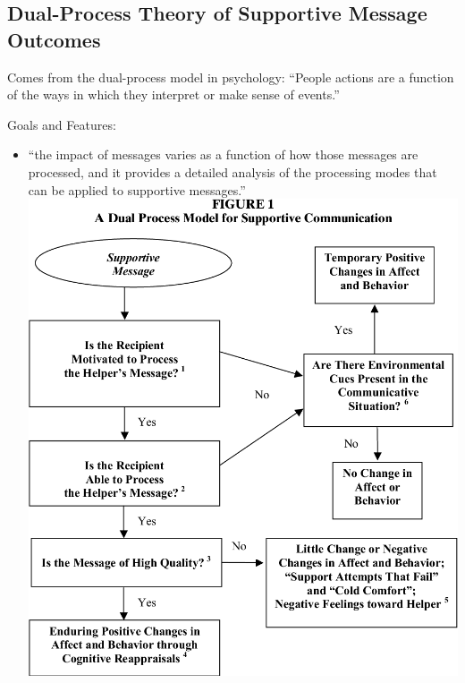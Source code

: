 \documentclass[
]{book}
\begin{document}
\hypertarget{dual-process-theory-of-supportive-message-outcomes}{%
\subsection{Dual-Process Theory of Supportive Message Outcomes}\label{dual-process-theory-of-supportive-message-outcomes}}

Comes from the dual-process model in psychology: ``People actions are a function of the ways in which they interpret or
make sense of events.'' \citep[pp.106]{burleson_2010}

Goals and Features:

\begin{itemize}
\item
  ``the impact of messages varies as a function of how those messages are processed, and it provides a detailed
  analysis of the processing modes that can be applied to supportive
  messages.''\href{https://www.semanticscholar.org/paper/Understanding-the-outcomes-of-supportive-A-approach-Burleson/34f073a64a9d4e5e092d816202ee415768ceb26e}{\includegraphics{images/9-Figure1-1.png}}

  \citep[pp.198]{Baxter_2008}
\end{itemize}
\end{document}
